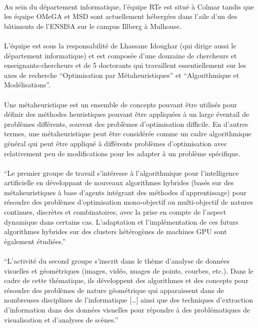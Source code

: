 \documentclass[a4paper,11pt,twoside,french,report]{../common/simplem}
\begin{document}
				\paragraph*{}
					Au sein du département informatique, l'équipe \gls{RTe} est situé à Colmar tandis que les équipe \gls{OMeGA} et \gls{MSD} sont actuellement hébergées dans l'aile d'un des bâtiments de l'\gls{ENSISA} sur le campus Illberg à Mulhouse.
				\paragraph*{}
					L'équipe est sous la responsabilité de Lhassane Idoughar (qui dirige aussi le département informatique) et est composée d'une douzaine de chercheurs et enseignants-chercheurs et de 5 doctorants qui travaillent essentiellement sur les axes de recherche ``Optimisation par Métaheuristiques'' et ``Algorithmique et Modélisations''.
				\paragraph*{}
					Une métaheuristique est un ensemble de concepts pouvant être utilisés pour définir des méthodes heuristiques pouvant être appliquées à un large éventail de problèmes différents, souvent des problèmes d’optimisation difficile. En d'autres termes, une métaheuristique peut être considérée comme un cadre algorithmique général qui peut être appliqué à différents problèmes d'optimisation avec relativement peu de modifications pour les adapter à un problème spécifique.
				\paragraph*{}
					``Le premier groupe de travail s’intéresse à l’algorithmique pour l’intelligence artificielle en développant de nouveaux algorithmes hybrides (basés sur des métaheuristiques à base d’agents intégrant des méthodes d’apprentissage) pour résoudre des problèmes d'optimisation mono-objectif ou multi-objectif de natures continues, discrètes et combinatoires, avec la prise en compte de l’aspect dynamique dans certains cas. L’adaptation et l’implémentation de ces futurs algorithmes hybrides sur des clusters hétérogènes de machines GPU sont également étudiées.''~\cite{IRIMAS_OMeGA}
				\paragraph*{}
					``L’activité du second groupe s’inscrit dans le thème d’analyse de données visuelles et géométriques (images, vidéo, nuages de points, courbes, etc.). Dans le cadre de cette thématique, ils développent des algorithmes et des concepts pour résoudre des problèmes de nature géométrique qui apparaissent dans de nombreuses disciplines de l’informatique [\ldots] ainsi que des techniques d’extraction d’information dans des données visuelles pour répondre à des problématiques de visualisation et d’analyses de scènes.''~\cite{IRIMAS_OMeGA}
\end{document}
